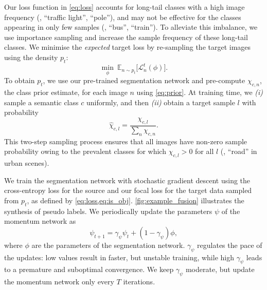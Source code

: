 Our loss function in \cref{eq:loss} accounts for long-tail classes with a high image frequency (\eg, ``traffic light'', ``pole''), and may not be effective for the classes appearing in only few samples (\eg, ``bus'', ``train'').
To alleviate this imbalance, we use importance sampling \cite{DoucetFG01} and increase the sample frequency of these long-tail classes.
We minimise the \emph{expected} target loss by re-sampling the target images using the density $p_t$:
\begin{equation}
\underset{\phi}{\min} \: \mathbb{E}_{n \sim p_t} \big[\mathcal{L}^t_n (\phi) \big].
\label{eq:is_obj}
\end{equation}
To obtain $p_t$, we use our pre-trained segmentation network and pre-compute $\chi_{c,n}$, the class prior estimate, for each image $n$ using \cref{eq:prior}.
At training time, we \textit{(i)} sample a semantic class $c$ uniformly, and then \textit{(ii)} obtain a target sample $l$ with probability 
\begin{equation}
\hat{\chi}_{c,l} = \frac{\chi_{c,l}}{\sum_n \chi_{c,n}}.
\end{equation}
This two-step sampling process ensures that all images have non-zero sample probability owing to the prevalent classes for which $\hat{\chi}_{c,l} > 0$ for all $l$ (\eg, ``road'' in urban scenes).

We train the segmentation network with stochastic gradient descent using the cross-entropy loss for the source and our focal loss for the target data sampled from $p_t$, as defined by \cref{eq:loss,eq:is_obj}.
\cref{fig:example_fusion} illustrates the synthesis of pseudo labels.
We periodically update the parameters $\psi$ of the momentum network as
\begin{equation}
\psi_{t+1} = \gamma_\psi \psi_t + (1 - \gamma_\psi) \phi,
\end{equation}
where $\phi$ are the parameters of the segmentation network.
$\gamma_\psi$ regulates the pace of the updates: low values result in faster, but unstable training,
while high $\gamma_\psi$ leads to a premature and suboptimal convergence.
We keep $\gamma_\psi$ moderate, but update the momentum network only every $T$ iterations.
